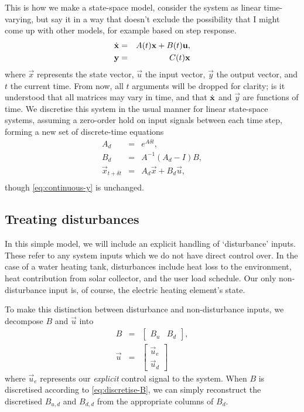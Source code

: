 This is how we make a state-space model, consider the system as linear time-varying, but say it in a way that doesn't exclude the possibility that I might come up with other models, for example based on step response.
\begin{eqnarray}
	\label{eq:continuous-xdot}
	\dot{\mathbf{x}} &=& A(t) \mathbf{x} + B(t) \mathbf{u}, \\
	\label{eq:continuous-y}
	\mathbf{y} &=& C(t) \mathbf{x}
\end{eqnarray}
where $\vec{x}$ represents the state vector, $\vec{u}$ the input vector, $\vec{y}$ the output vector, and $t$ the current time.
From now, all $t$ arguments will be dropped for clarity; is it understood that all matrices may vary in time, and that $\dot{\mathbf{x}}$ and $\vec{y}$ are functions of time.
We discretise this system in the usual manner for linear state-space systems, assuming a zero-order hold on input signals between each time step, forming a new set of discrete-time equations
\begin{eqnarray}
	\label{eq:discretise-A}
	A_d &=& e^{A \delta t}, \\
	\label{eq:discretise-B}
	B_d &=& A^{-1} (A_d - I) B, \\
	\label{eq:discrete-xdot}
	\vec{x}_{t + \delta t} &=& A_d \vec{x} + B_d \vec{u}, \\
\end{eqnarray}
though \autoref{eq:continuous-y} is unchanged.

\subsection{Treating disturbances}

In this simple model, we will include an explicit handling of `disturbance' inputs.
These refer to any system inputs which we do not have direct control over.
In the case of a water heating tank, disturbances include heat loss to the environment, heat contribution from solar collector, and the user load schedule.
Our only non-disturbance input is, of course, the electric heating element's state.

To make this distinction between disturbance and non-disturbance inputs, we decompose $B$ and $\vec{u}$ into
\begin{eqnarray}
	B &=& \left[\begin{array}{cc}
		B_u & B_d
	\end{array}\right], \\
	\vec{u} &=& \left[\begin{array}{c}
		\vec{u}_e \\ \vec{u}_d
	\end{array}\right]
\end{eqnarray}
where $\vec{u}_e$ represents our \emph{explicit} control signal to the system.
When $B$ is discretised according to \autoref{eq:discretise-B}, we can simply reconstruct the discretised $B_{u, d}$ and $B_{d, d}$ from the appropriate columns of $B_d$.

